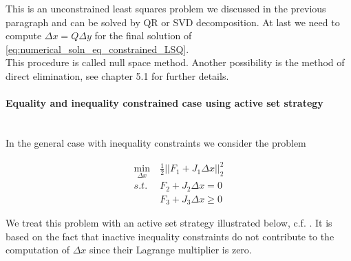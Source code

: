 \documentclass{scrartcl}[12pt, halfparskip]
\numberwithin{equation}{section}
\numberwithin{figure}{section}
\numberwithin{table}{section}
\begin{document}
This is an unconstrained least squares problem we discussed in the previous paragraph and can be solved by QR or SVD decomposition. At last we need to compute $\Delta x = Q \Delta y$ for the final solution of \cref{eq:numerical_soln_eq_constrained_LSQ}. \\

This procedure is called null space method. Another possibility is the method of direct elimination, see \cite{numerical_methods_lsq_Bjorck} chapter 5.1 for further details.


\paragraph{Equality and inequality constrained case using active set strategy} \label{par:theory_active_set_strategy} \mbox{}\\
In the general case with inequality constraints we consider the problem

\begin{align}
\min_{\Delta x} & \ \frac{1}{2} || F_1 + J_1 \Delta x ||_2^2 \label{eq:numerical_soln_ineq_constrained_LSQ} \\
s.t. & \ F_2 + J_2 \Delta x = 0 \nonumber \\
&  \ F_3 + J_3 \Delta x \ge 0 \nonumber
\end{align}

We treat this problem with an active set strategy illustrated below, c.f. \cite{diss_bock}. It is based on the fact that inactive inequality constraints do not contribute to the computation of $\Delta x$ since their Lagrange multiplier is zero.
\end{document}
